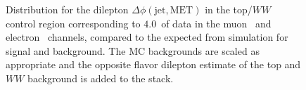 \begin{figure}[!hbtp]
\begin{center}
\caption{Distribution for the dilepton $\Delta\phi\left(\mbox{jet},\mbox{MET}\right)$ in the top/$WW$ control region corresponding 
to $4.0$~\ifb of data in the muon~ and electron~ channels, 
compared to the expected from simulation for signal and background. The MC backgrounds are scaled as 
appropriate and the opposite flavor dilepton estimate of the top and $WW$ background is added to the stack.}
\label{fig:topww_dphijetmet}
\end{center}
\end{figure}
